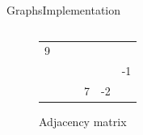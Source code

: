 \begin{frame}{Graphs}{Implementation}
\begin{columns}
\begin{column}{0.45\linewidth}
\begin{figure}[!h]
\begin{tabular}{p{0.25em}p{1.15em}p{1.15em}p{1.15em}p{1.15em}p{1.15em}}
          \multicolumn{1}{|c|}{\color{Mittel-Gruen}9} & \multicolumn{1}{c|}{}\\
          \cline{3-6}
          {} & {%
            \def\verticenumber{2}%
          } &
          \multicolumn{1}{|c|}{} & \multicolumn{1}{c}{} &
          \multicolumn{1}{|c|}{} & \multicolumn{1}{c|}{\color{Mittel-Gruen}-1}\\
          \cline{3-6}
          {} & {%
            \def\verticenumber{3}%
          } &
          \multicolumn{1}{|c|}{} & \multicolumn{1}{c}{\color{Mittel-Gruen}7} &
          \multicolumn{1}{|c|}{\color{Mittel-Gruen}-2} & \multicolumn{1}{c|}{}\\
          \cline{3-6}
        \end{tabular}
        \caption{Adjacency matrix}
      \end{figure}
    \end{column}
  \end{columns}
\end{frame}


